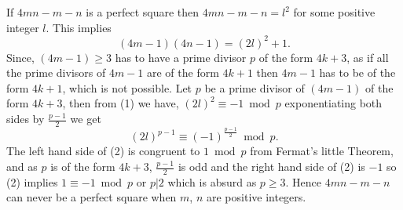 \documentclass{article}
\begin{document}
	If $4mn-m-n$ is a perfect square then $4mn-m-n=l^2$ for some positive integer $l$. This implies \begin{equation}
	(4m-1)(4n-1)=(2l)^2+1.
	\end{equation} Since, $(4m-1)\geq 3$ has to have a prime divisor $p$ of the form $4k+3$, as if all the prime divisors of $4m-1$ are of the form $4k+1$ then $4m-1$ has to be of the form $4k+1$, which is not possible. Let $p$  be a prime divisor of $(4m-1)$ of the form $4k+3$, then from (1) we have, $(2l)^2\equiv -1 \bmod p$ exponentiating both sides by $\frac{p-1}{2}$ we get 
	\begin{equation}
	(2l)^{p-1}\equiv (-1)^{\frac{p-1}{2}}\bmod p.
	\end{equation}
The left hand side of (2) is congruent to $1\bmod p$ from Fermat's little Theorem, and as $p$ is of the form $4k+3$, $\frac{p-1}{2}$ is odd and the right hand side of (2) is $-1$ so (2) implies $1\equiv -1 \bmod p$ or $p|2$ which is absurd as $p\geq 3$. Hence $4mn-m-n$ can never be a perfect square when $m$, $n$ are positive integers.
	
	
\end{document}
